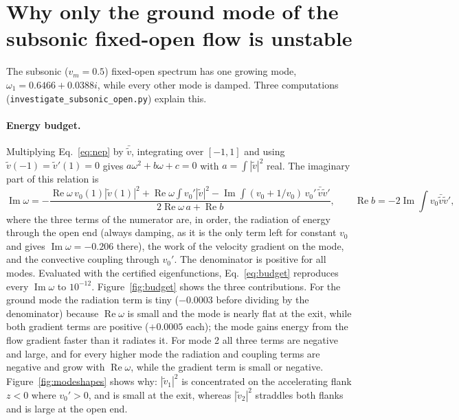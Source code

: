 \documentclass[11pt]{article}
\newcommand{\Real}{\operatorname{Re}}
\newcommand{\Imag}{\operatorname{Im}}
\begin{document}
\section{Why only the ground mode of the subsonic fixed-open flow is unstable}

The subsonic ($v_m=0.5$) fixed-open spectrum has one growing mode, $\omega_1 = 0.6466+0.0388i$, while every
other mode is damped. Three computations (\texttt{investigate\_subsonic\_open.py}) explain this.

\paragraph{Energy budget.} Multiplying Eq.~\eqref{eq:nep} by $\bar{\tilde v}$, integrating over $[-1,1]$
and using $\tilde v(-1)=\tilde v'(1)=0$ gives $a\omega^2+b\omega+c=0$ with $a=\int|\tilde v|^2$ real. The
imaginary part of this relation is
\begin{equation}
  \Imag\omega = -\frac{\Real\omega\, v_0(1)|\tilde v(1)|^2
  + \Real\omega\int v_0'|\tilde v|^2
  - \Imag\!\int (v_0+1/v_0)\,v_0'\,\bar{\tilde v}\tilde v'}{2\Real\omega\,a + \Real b},
  \qquad \Real b = -2\Imag\!\int v_0\bar{\tilde v}\tilde v',
  \label{eq:budget}
\end{equation}
where the three terms of the numerator are, in order, the radiation of energy through the open end (always
damping, as it is the only term left for constant $v_0$ and gives $\Imag\omega=-0.206$ there), the work of the
velocity gradient on the mode, and the convective coupling through $v_0'$. The denominator is positive for all
modes. Evaluated with the certified eigenfunctions, Eq.~\eqref{eq:budget} reproduces every $\Imag\omega$ to
$10^{-12}$. Figure~\ref{fig:budget} shows the three contributions. For the ground mode the radiation term is
tiny ($-0.0003$ before dividing by the denominator) because $\Real\omega$ is small and the mode is nearly flat at
the exit, while both gradient terms are positive ($+0.0005$ each); the mode gains energy from the flow
gradient faster than it radiates it. For mode 2 all three terms are negative and large, and for every higher
mode the radiation and coupling terms are negative and grow with $\Real\omega$, while the gradient term is small
or negative. Figure~\ref{fig:modeshapes} shows why: $|\tilde v_1|^2$ is concentrated on the accelerating flank
$z<0$ where $v_0'>0$, and is small at the exit, whereas $|\tilde v_2|^2$ straddles both flanks and is large at
the open end.
\end{document}
